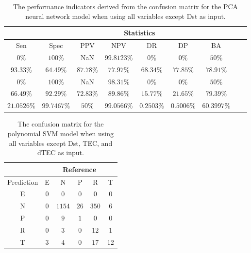 \begin{table}[!ht]
	\centering
	\begin{tabular}{|c|c|c|c|c|c|c|c|c|}
		\hline
		 & \multicolumn{7}{c|}{Statistics} \\ \hline
		Sen & Spec & PPV & NPV & DR & DP & BA \\ \hline
		$0\%$ & $100\%$ & NaN & $99.8123\%$ & $0\%$ & $0\%$ & $50\%$ \\ \hline
		$93.33\%$ & $64.49\%$ & $87.78\%$ & $77.97\%$ & $68.34\%$ & $77.85\%$ & $78.91\%$ \\ \hline
		$0\%$ & $100\%$ & NaN & $98.31\%$ & $0\%$ & $0\%$ & $50\%$ \\ \hline
		$66.49\%$ & $92.29\%$ & $72.83\%$ & $89.86\%$ & $15.77\%$ & $21.65\%$ & $79.39\%$ \\ \hline
		$21.0526\%$ & $99.7467\%$ & $50\%$ & $99.0566\%$ & $0.2503\%$ & $0.5006\%$ & $60.3997\%$ \\ \hline
	\end{tabular}
	\caption{The performance indicators derived from the confusion matrix for the PCA neural network model when using all variables except Dst as input.}
	\label{tab:cs:noDst:pcaNNet}
\end{table}

\begin{table}[!ht]
	\centering
	\begin{tabular}{|c|c|c|c|c|c|}
		\hline
		 & \multicolumn{5}{|c|}{Reference} \\ \hline
		 Prediction & E & N & P & R & T \\ \hline
		 E & $0$ & $0$ & $0$ & $0$ & $0$ \\ \hline
		 N & $0$ & $1154$ & $26$ & $350$ & $6$ \\ \hline
		 P & $0$ & $9$ & $1$ & $0$ & $0$ \\ \hline
		 R & $0$ & $3$ & $0$ & $12$ & $1$ \\ \hline
		 T & $3$ & $4$ & $0$ & $17$ & $12$ \\ \hline
	\end{tabular}
	\caption{The confusion matrix for the polynomial SVM model when using all variables except Dst, TEC, and dTEC as input.}
	\label{tab:cm:noTEC:svmPoly}
\end{table}

